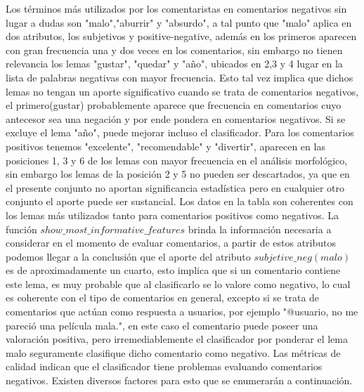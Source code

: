 \documentclass[12pt]{article}
\begin{document}
Los términos más utilizados por los comentaristas en comentarios negativos sin lugar a dudas son "malo","aburrir" y "absurdo", a tal punto que "malo" aplica en dos atributos, los subjetivos y positive-negative, además en los primeros aparecen con gran frecuencia una y dos veces en los comentarios, sin embargo no tienen relevancia los lemas "gustar", "quedar" y "año", ubicados en 2,3 y 4 lugar en la lista de palabras negativas con mayor frecuencia. Esto tal vez implica que dichos lemas no tengan un aporte significativo cuando se trata de comentarios negativos, el primero(gustar) probablemente aparece que frecuencia en comentarios cuyo antecesor sea una negación y por ende pondera en comentarios negativos. Si se excluye el lema "año", puede mejorar incluso el clasificador.
Para los comentarios positivos tenemos "excelente", "recomendable" y "divertir", aparecen en las posiciones 1, 3 y 6 de los lemas con mayor frecuencia en el análisis morfológico, sin embargo los lemas de la posición 2 y 5 no pueden ser descartados, ya que en el presente conjunto no aportan significancia estadística pero en cualquier otro conjunto el aporte puede ser sustancial.
Los datos en la tabla son coherentes con los lemas más utilizados tanto para comentarios positivos como negativos. La función $show\_most\_informative\_features$ brinda la información necesaria a considerar en el momento de evaluar comentarios, a partir de estos atributos podemos llegar a la conclusión que el aporte del atributo $subjetive\_neg(malo)$ es de aproximadamente un cuarto, esto implica que si un comentario contiene este lema, es muy probable que al clasificarlo se lo valore como negativo, lo cual es coherente con el tipo de comentarios en general, excepto si se trata de comentarios que actúan como respuesta a usuarios, por ejemplo "@usuario, no me pareció una película mala.", en este caso el comentario puede poseer una valoración positiva, pero irremediablemente el clasificador por ponderar el lema malo seguramente clasifique dicho comentario como negativo.
Las métricas de calidad indican que el clasificador tiene problemas evaluando comentarios negativos. Existen diversos factores para esto que se enumerarán a continuación.
\end{document}
